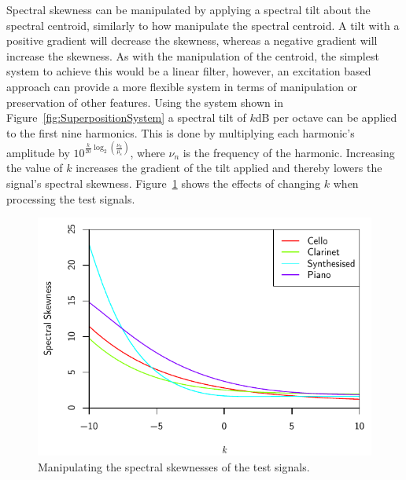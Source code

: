 			Spectral skewness can be manipulated by applying a spectral tilt about the spectral centroid,
			similarly to how \citet{williams2007perceptually} manipulate the spectral centroid. A tilt with a
			positive gradient will decrease the skewness, whereas a negative gradient will increase the
			skewness. As with the manipulation of the centroid, the simplest system to achieve this would be a
			linear filter, however, an excitation based approach can provide a more flexible system in terms of
			manipulation or preservation of other features. Using the system shown in
			Figure~\ref{fig:SuperpositionSystem} a spectral tilt of $k$dB per octave can be applied to the
			first nine harmonics. This is done by multiplying each harmonic's amplitude by
			$10^{\frac{k}{20}\log_{2} \left( \frac{\nu_{n}}{\mu_{\mathrm{s}}} \right)}$, where $\nu_{n}$ is the
			frequency of the harmonic. Increasing the value of $k$ increases the gradient of the tilt applied
			and thereby lowers the signal's spectral skewness.  Figure~\ref{fig:MoveSkewnesses} shows the
			effects of changing $k$ when processing the test signals.

			\begin{figure}[h!]
				\centering
				\includegraphics{chapter6/Images/MoveSkewnesses.pdf}
				\caption{Manipulating the spectral skewnesses of the test signals.}
				\label{fig:MoveSkewnesses}
			\end{figure}

